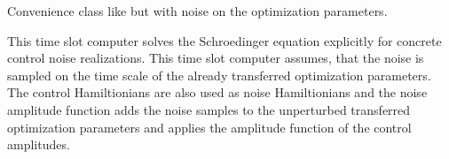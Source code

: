 \documentclass[letterpaper,10pt,english]{sphinxmanual}
\begin{document}
\begin{fulllineitems}
Convenience class like  but with noise on the
optimization parameters.

This time slot computer solves the Schroedinger equation explicitly for
concrete control noise realizations. This time slot computer assumes,
that the noise is sampled on the time scale of the already transferred
optimization parameters. The control Hamiltionians are also used as noise
Hamiltionians and the noise amplitude function adds the noise samples to
the unperturbed transferred optimization parameters and applies the
amplitude function of the control amplitudes.

\end{fulllineitems}

\end{document}

